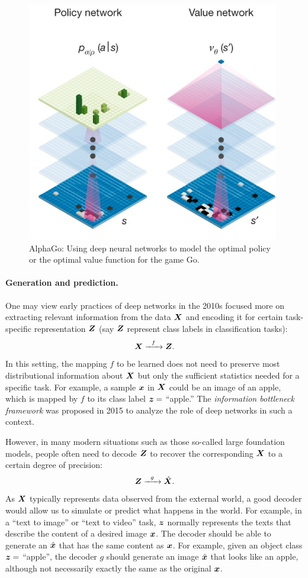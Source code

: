 \documentclass[../../book-main.tex]{subfiles}
\begin{document}
\begin{figure}
    \centering
    \includegraphics[width=0.5\linewidth]{figures/Policy-Value.png}
    \caption{AlphaGo: Using deep neural networks to model the optimal policy or the optimal value function for the game Go. }
    \label{fig:Alpha-Go}
\end{figure}

\paragraph{Generation and prediction.}
One may view early practices of deep networks in the 2010s focused more on extracting relevant information from the data $\bm{X}$ and encoding it for certain task-specific representation $\bm{Z}$ (say $\bm{Z}$ represent class labels in classification tasks):
\begin{equation}
    \bm{X}   \xrightarrow{\hspace{2mm} f \hspace{2mm}} \bm{Z}.
       \label{eqn:encoding-deep-networks}
\end{equation}
In this setting, the mapping $f$ to be learned does not need to preserve most  distributional information about $\bm{X}$ but only the sufficient statistics needed for a specific task. For example, a sample $\bm{x}$ in $\bm{X}$ could be an image of an apple, which is mapped by $f$ to its class label $\bm{z} =$ ``apple.'' The {\em information bottleneck framework} \cite{Tishby-ITW2015} was proposed in 2015 to analyze the role of deep networks in such a context.
 
However, in many modern situations such as those so-called large foundation models,  people often need to decode $\bm{Z}$ to recover the corresponding $\bm{X}$ to a certain degree of precision:
\begin{equation}
    \bm{Z}   \xrightarrow{\hspace{2mm} g  \hspace{2mm}} \hat {\bm{X}}.
       \label{eqn:decoding-deep-networks}
\end{equation}
As $\bm{X}$ typically represents data observed from the external world, a good decoder would allow us to simulate or predict what happens in the world. For example, in a ``text to image'' or ``text to video'' task, $\bm{z}$ normally represents the texts that describe the content of a desired image $\bm{x}$. The decoder should be able to generate an $\hat {\bm{x}}$ that has the same content as $\bm{x}$. For example, given an object class $\bm{z} = $ ``apple'', the decoder $g$ should generate an image $\hat {\bm{x}}$ that looks like an apple, although not necessarily exactly the same as the original $\bm{x}$. 
\end{document}

